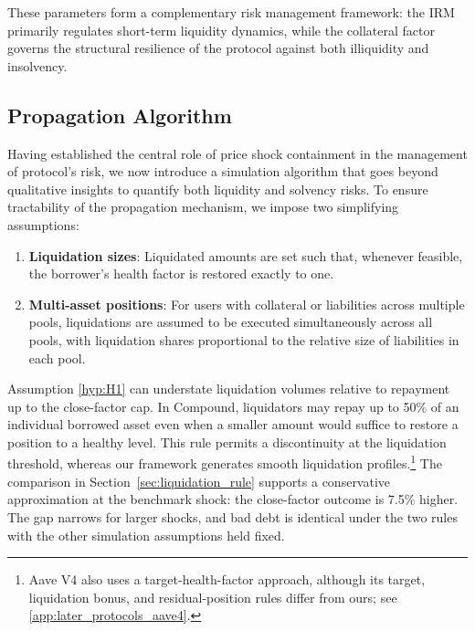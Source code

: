\documentclass[a4paper,UKenglish,cleveref, autoref, thm-restate]{informs3}
\DeclareRobustCommand{\latestrev}[1]{{\color{red}\hypersetup{linkcolor=red,citecolor=red,urlcolor=red}#1}}
\begin{document}
These parameters form a complementary risk management framework: the IRM primarily regulates short-term liquidity dynamics, while the collateral factor governs the structural resilience of the protocol against both illiquidity and insolvency.

\medskip

\subsection{Propagation Algorithm}
\label{sec:Propagation_Algo}

Having established the central role of price shock containment in the management of protocol's risk, we now introduce a simulation algorithm that goes beyond qualitative insights to quantify both liquidity and solvency risks. To ensure tractability of the propagation mechanism, we impose two simplifying assumptions:

\begin{enumerate}[label=\textbf{A\arabic*}]
    \item \label{hyp:H1} \textbf{Liquidation sizes}: Liquidated amounts are set such that, whenever feasible, the borrower’s health factor is restored exactly to one.

    \item \label{hyp:H2} \textbf{Multi-asset positions}: For users with collateral or liabilities across multiple pools, liquidations are assumed to be executed simultaneously across all pools, with liquidation shares proportional to the relative size of liabilities in each pool.
\end{enumerate}

\latestrev{Assumption \ref{hyp:H1} can understate liquidation volumes relative to repayment up to the close-factor cap.} In Compound, liquidators may \latestrev{repay up to 50\% of an individual borrowed asset} even when a smaller amount would suffice to restore a position to a healthy level. This rule \latestrev{permits a discontinuity} at the liquidation threshold, whereas our framework generates smooth liquidation profiles.\footnote{\latestrev{Aave V4 also uses a target-health-factor approach, although its target, liquidation bonus, and residual-position rules differ from ours; see \ref{app:later_protocols_aave4}.}} \latestrev{The comparison in Section~\ref{sec:liquidation_rule} supports a conservative approximation at the benchmark shock: the close-factor outcome is 7.5\% higher. The gap narrows for larger shocks, and bad debt is identical under the two rules with the other simulation assumptions held fixed.}
\end{document}
